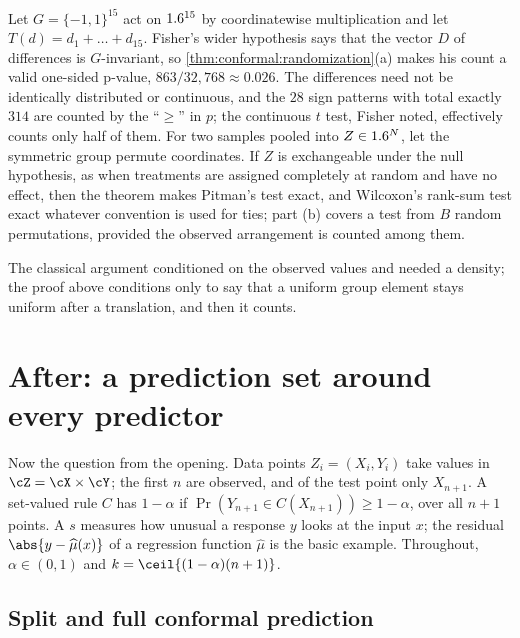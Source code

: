 \begin{refsection}
\begin{example}\label{exa:conformal:darwin}
Let $G=\{-1,1\}^{15}$ act on $1.6^{15}$ by coordinatewise multiplication and let $T(d)=d_1+\dots+d_{15}$. Fisher's wider hypothesis says that the vector $D$ of differences is $G$-invariant, so \cref{thm:conformal:randomization}(a) makes his count a valid one-sided p-value, $863/32{,}768\approx0.026$. The differences need not be identically distributed or continuous, and the $28$ sign patterns with total exactly $314$ are counted by the ``$\ge$'' in $p$; the continuous $t$ test, Fisher noted, effectively counts only half of them. For two samples pooled into $Z\in1.6^N$, let the symmetric group permute coordinates. If $Z$ is exchangeable under the null hypothesis, as when treatments are assigned completely at random and have no effect, then the theorem makes Pitman's test exact, and Wilcoxon's rank-sum test exact whatever convention is used for ties; part (b) covers a test from $B$ random permutations, provided the observed arrangement is counted among them.
\end{example}

The classical argument conditioned on the observed values and needed a density; the proof above conditions only to say that a uniform group element stays uniform after a translation, and then it counts.

\section{After: a prediction set around every predictor}\label{sec:conformal:after-new}

Now the question from the opening. Data points $Z_i=(X_i,Y_i)$ take values in $\cZ=\cX\times\cY$; the first $n$ are observed, and of the test point only $X_{n+1}$. A set-valued rule $C$ has  $1-\alpha$ if $\Pr(Y_{n+1}\in C(X_{n+1}))\ge1-\alpha$, over all $n+1$ points. A  $s$ measures how unusual a response $y$ looks at the input $x$; the residual $\abs{y-\widehat\mu(x)}$ of a regression function $\widehat\mu$ is the basic example. Throughout, $\alpha\in(0,1)$ and $k=\ceil{(1-\alpha)(n+1)}$.

\subsection{Split and full conformal prediction}


\end{refsection}
